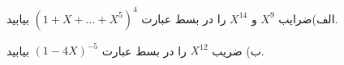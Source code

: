 \EXERCISE
الف)ضرایب 
$X^9$
و
$X^{14}$
را در بسط عبارت 
$(1 + X + ... + X^5)^4$
بیابید.

ب) ضریب
$X^{12}$
 را در بسط عبارت 
$(1 - 4X)^{-5}$
بیابید.